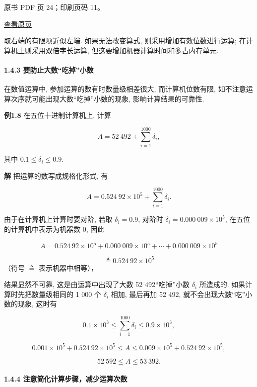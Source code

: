 \clearpage

原书 PDF 页 24；印刷页码 11。

\href{source-images/pdf-024.jpeg}{查看原页}

取右端的有限项近似左端. 如果无法改变算式, 则采用增加有效位数进行运算; 在计算机上则采用双倍字长运算, 但这要增加机器计算时间和多占内存单元.

\paragraph{1.4.3 要防止大数``吃掉''小数}\label{ch01-ux8981ux9632ux6b62ux5927ux6570ux5403ux6389ux5c0fux6570}

在数值运算中, 参加运算的数有时数量级相差很大, 而计算机位数有限, 如不注意运算次序就可能出现大数``吃掉''小数的现象, 影响计算结果的可靠性.

\textbf{例1.8} 在五位十进制计算机上, 计算

\[
A = 52\ 492 + \sum_{i=1}^{1000} \delta_i,
\]

其中 \(0.1 \leqslant \delta_i \leqslant 0.9\).

\textbf{解} 把运算的数写成规格化形式, 有

\[
A = 0.524\ 92 \times 10^5 + \sum_{i=1}^{1000} \delta_i.
\]

由于在计算机上计算时要对阶, 若取 \(\delta_i = 0.9\), 对阶时 \(\delta_i = 0.000\ 009 \times 10^5\), 在五位的计算机中表示为机器数 0, 因此

\[
A = 0.524\ 92 \times 10^5 + 0.000\ 009 \times 10^5 + \cdots + 0.000\ 009 \times 10^5
\]

\[
\triangleq 0.524\ 92 \times 10^5
\] （符号 \(\triangleq\) 表示机器中相等），

结果显然不可靠, 这是由运算中出现了大数 52 492``吃掉''小数 \(\delta_i\) 所造成的. 如果计算时先把数量级相同的 1 000 个 \(\delta_i\) 相加, 最后再加 52 492, 就不会出现大数``吃''小数的现象, 这时有

\[
0.1 \times 10^3 \leqslant \sum_{i=1}^{1000} \delta_i \leqslant 0.9 \times 10^3,
\]

\[
0.001 \times 10^5 + 0.524\ 92 \times 10^5 \leqslant A \leqslant 0.009 \times 10^5 + 0.524\ 92 \times 10^5,
\]

\[
52\ 592 \leqslant A \leqslant 53\ 392.
\]

\paragraph{1.4.4 注意简化计算步骤，减少运算次数}\label{ch01-ux6ce8ux610fux7b80ux5316ux8ba1ux7b97ux6b65ux9aa4ux51cfux5c11ux8fd0ux7b97ux6b21ux6570}

